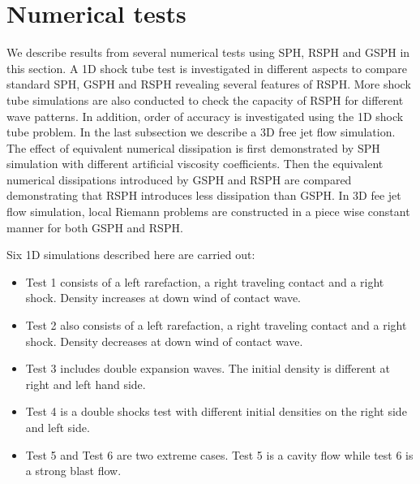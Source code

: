 \documentclass[preprint,12pt,authoryear]{elsarticle}
\begin{document}
\section{Numerical tests} \label{sec:numericaltests}
We describe results from several numerical tests using SPH, RSPH and GSPH in this section.
A 1D shock tube test is investigated in different aspects to compare standard SPH, GSPH and RSPH revealing several features of RSPH. More shock tube simulations are also conducted to check the capacity of RSPH for different wave patterns. In addition, order of accuracy is investigated using the 1D shock tube problem. In the last subsection we describe a 3D free jet flow simulation. The effect of equivalent numerical dissipation is first demonstrated by SPH simulation with different artificial viscosity coefficients. Then the equivalent numerical dissipations introduced by GSPH and RSPH are compared demonstrating that RSPH introduces less dissipation than GSPH. In 3D fee jet flow simulation, local Riemann problems are constructed in a piece wise constant manner for both GSPH and RSPH.

Six 1D simulations described here are carried out:
\begin{itemize}%
\item Test 1 consists of a left rarefaction, a right traveling contact and a right shock. Density increases at down wind of contact wave. 
\item Test 2 also consists of a left rarefaction, a right traveling contact and a right shock. Density decreases at down wind of contact wave. 
\item Test 3 includes double expansion waves. The initial density is different at right and left hand side. 
\item Test 4 is a double shocks test with different initial densities on the right side and left side.
\item Test 5 and Test 6 are two extreme cases. Test 5 is a cavity flow while test 6 is a strong blast flow.
\end{itemize}
\end{document}
